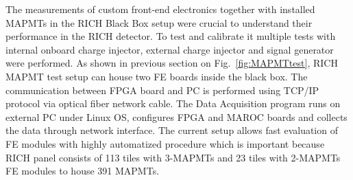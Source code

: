 The measurements of custom front-end electronics together with installed MAPMTs in the RICH Black Box setup were crucial to understand their performance in the RICH detector.
To test and calibrate it multiple tests with internal onboard charge injector, external charge injector and signal generator were performed.
As shown in previous section on Fig.~\ref{fig:MAPMTtest}, RICH MAPMT test setup can house two FE boards inside the black box.
The communication between FPGA board and PC is performed using TCP/IP protocol via optical fiber network cable.
The Data Acquisition program runs on external PC under Linux OS, configures FPGA and MAROC boards and collects the data through network interface.
The current setup allows fast evaluation of FE modules with highly automatized procedure which is important because RICH panel consists of 113 tiles with 3-MAPMTs and 23 tiles with 2-MAPMTs FE modules to house 391 MAPMTs.
